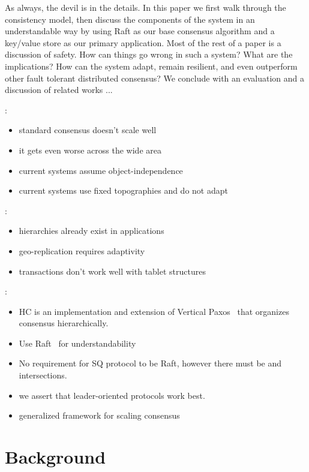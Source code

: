 \documentclass[10pt,twocolumn]{article}
\begin{document}
As always, the devil is in the details.
In this paper we first walk through the consistency model, then discuss the
components of the system in an understandable way by using Raft as our base
consensus algorithm and a key/value store as our primary application.
Most of the rest of a paper is a discussion of safety.
How can things go wrong in such a system? What are the implications? How can
the system adapt, remain resilient, and even outperform other fault tolerant
distributed consensus?
We conclude with an evaluation and a discussion of related works ...

:

\begin{itemize}
    \item standard consensus doesn't scale well
    \item it gets even worse across the wide area
    \item current systems assume object-independence
    \item current systems use fixed topographies and do not adapt
\end{itemize}

:

\begin{itemize}
    \item hierarchies already exist in applications
    \item geo-replication requires adaptivity
    \item transactions don't work well with tablet structures 
\end{itemize}

:

\begin{itemize}
    \item HC is an implementation and extension of Vertical Paxos~\cite{vertical_paxos} that organizes consensus hierarchically.
    \item Use Raft~\cite{raft} for understandability
    \item No requirement for SQ protocol to be Raft, however there must be \roo and \sub intersections.
    \item we assert that leader-oriented protocols work best.
    \item generalized framework for scaling consensus
\end{itemize}

\section*{Background}
\end{document}
